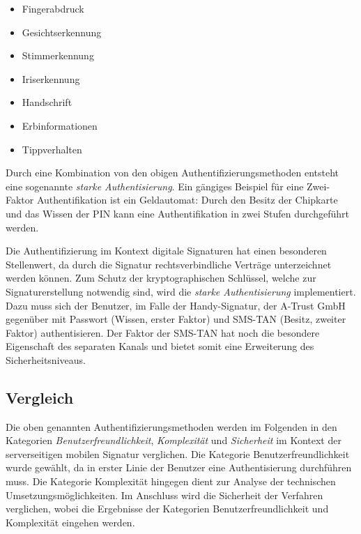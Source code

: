 \documentclass[11pt,a4paper,ngerman]{scrreprt}
\begin{document}
\begin{description}[font=\rmfamily]
    \begin{itemize}
        \item Fingerabdruck
        \item Gesichtserkennung
        \item Stimmerkennung
        \item Iriserkennung
        \item Handschrift
        \item Erbinformationen
        \item Tippverhalten
    \end{itemize}
\end{description}
Durch eine Kombination von den obigen Authentifizierungsmethoden entsteht eine sogenannte \emph{starke Authentisierung}. Ein gängiges Beispiel für eine Zwei-Faktor Authentifikation ist ein Geldautomat: Durch den Besitz der Chipkarte und das Wissen der PIN kann eine Authentifikation in zwei Stufen durchgeführt werden.

Die Authentifizierung im Kontext digitale Signaturen hat einen besonderen Stellenwert, da durch die Signatur rechtsverbindliche Verträge unterzeichnet werden können. Zum Schutz der kryptographischen Schlüssel, welche zur Signaturerstellung notwendig sind, wird die \emph{starke Authentisierung} implementiert. Dazu muss sich der Benutzer, im Falle der Handy-Signatur, der A-Trust GmbH gegenüber mit Passwort (Wissen, erster Faktor) und SMS-TAN (Besitz, zweiter Faktor) authentisieren. Der Faktor der SMS-TAN hat noch die besondere Eigenschaft des separaten Kanals und bietet somit eine Erweiterung des Sicherheitsniveaus.

\subsection{Vergleich}\label{sec:AuthentifizierungVergleich}
Die oben genannten Authentifizierungsmethoden werden im Folgenden in den Kategorien \emph{Benutzerfreundlichkeit}, \emph{Komplexität} und \emph{Sicherheit} im Kontext der serverseitigen mobilen Signatur verglichen. Die Kategorie Benutzerfreundlichkeit wurde gewählt, da in erster Linie der Benutzer eine Authentisierung durchführen muss. Die Kategorie Komplexität hingegen dient zur Analyse der technischen Umsetzungsmöglichkeiten. Im Anschluss wird die Sicherheit der Verfahren verglichen, wobei die Ergebnisse der Kategorien Benutzerfreundlichkeit und Komplexität eingehen werden.
\end{document}
